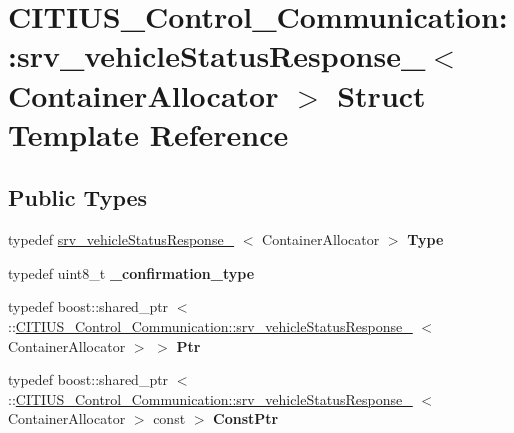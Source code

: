 \hypertarget{struct_c_i_t_i_u_s___control___communication_1_1srv__vehicle_status_response__}{\section{\-C\-I\-T\-I\-U\-S\-\_\-\-Control\-\_\-\-Communication\-:\-:srv\-\_\-vehicle\-Status\-Response\-\_\-$<$ \-Container\-Allocator $>$ \-Struct \-Template \-Reference}
\label{struct_c_i_t_i_u_s___control___communication_1_1srv__vehicle_status_response__}
}
\subsection*{\-Public \-Types}
\begin{DoxyCompactItemize}
\item 
\hypertarget{struct_c_i_t_i_u_s___control___communication_1_1srv__vehicle_status_response___a96134ecbf9f4c4751d1e6d008fc78770}{typedef \*
\hyperlink{struct_c_i_t_i_u_s___control___communication_1_1srv__vehicle_status_response__}{srv\-\_\-vehicle\-Status\-Response\-\_\-}\*
$<$ \-Container\-Allocator $>$ {\bfseries \-Type}}\label{struct_c_i_t_i_u_s___control___communication_1_1srv__vehicle_status_response___a96134ecbf9f4c4751d1e6d008fc78770}

\item 
\hypertarget{struct_c_i_t_i_u_s___control___communication_1_1srv__vehicle_status_response___af17c92e5ec662fbff397f1ab4e3989f2}{typedef uint8\-\_\-t {\bfseries \-\_\-confirmation\-\_\-type}}\label{struct_c_i_t_i_u_s___control___communication_1_1srv__vehicle_status_response___af17c92e5ec662fbff397f1ab4e3989f2}

\item 
\hypertarget{struct_c_i_t_i_u_s___control___communication_1_1srv__vehicle_status_response___a0c55d75ddf70fbb3ab08ca5abda03874}{typedef boost\-::shared\-\_\-ptr\*
$<$ \-::\hyperlink{struct_c_i_t_i_u_s___control___communication_1_1srv__vehicle_status_response__}{\-C\-I\-T\-I\-U\-S\-\_\-\-Control\-\_\-\-Communication\-::srv\-\_\-vehicle\-Status\-Response\-\_\-}\*
$<$ \-Container\-Allocator $>$ $>$ {\bfseries \-Ptr}}\label{struct_c_i_t_i_u_s___control___communication_1_1srv__vehicle_status_response___a0c55d75ddf70fbb3ab08ca5abda03874}

\item 
\hypertarget{struct_c_i_t_i_u_s___control___communication_1_1srv__vehicle_status_response___acc14518a3f356d0e633161c6ea449610}{typedef boost\-::shared\-\_\-ptr\*
$<$ \-::\hyperlink{struct_c_i_t_i_u_s___control___communication_1_1srv__vehicle_status_response__}{\-C\-I\-T\-I\-U\-S\-\_\-\-Control\-\_\-\-Communication\-::srv\-\_\-vehicle\-Status\-Response\-\_\-}\*
$<$ \-Container\-Allocator $>$ const  $>$ {\bfseries \-Const\-Ptr}}\label{struct_c_i_t_i_u_s___control___communication_1_1srv__vehicle_status_response___acc14518a3f356d0e633161c6ea449610}

\end{DoxyCompactItemize}
